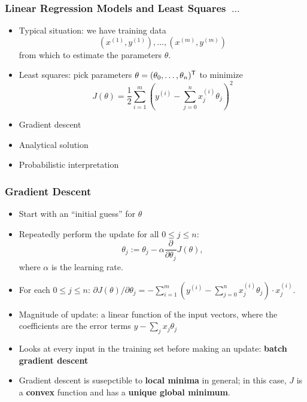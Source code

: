 \documentclass[xcolor=table]{beamer}
\newcommand{\trans}[1]{\ensuremath{#1}^{\footnotesize{\textsf{T}}}}
\begin{document}
\begin{frame}[t]
\frametitle{Linear Regression Models and Least Squares~$\ldots$}
\begin{itemize}
    \item Typical situation: we have training data 
    \[(x^{(1)}, y^{(1)}), \ldots, (x^{(m)}, y^{(m)})\] 
    from which to estimate the parameters $\theta$.
    
    \item Least squares: pick parameters $\theta = \trans{(\theta_0, \ldots, \theta_n)}$ to minimize 
    \[J(\theta) = 
    \frac{1}{2} \sum_{i = 1}^{m} \left (y^{(i)} - \sum_{j = 0}^{n} x^{(i)}_j \theta_j \right )^2\]   
\end{itemize}

\pause

\begin{itemize}
    \item Gradient descent
    \item Analytical solution
    \item Probabilistic interpretation
\end{itemize}
\end{frame}

\begin{frame}[t]
\frametitle{Gradient Descent}
\begin{itemize}
    \item Start with an ``initial guess'' for $\theta$

    \pause

    \item Repeatedly perform the update for all $0 \leq j \leq n$:
    \[
        \theta_j := \theta_j - \alpha \frac{\partial}{\partial \theta_j} J(\theta),
    \]
    where $\alpha$ is the learning rate.

    \pause 

    \item For each $0 \leq j \leq n$:
    $
        \partial J(\theta)/ \partial \theta_j = - \sum_{i = 1}^m 
        \left ( y^{(i)} - \sum_{j = 0}^n x_j^{(i)} \theta_j \right ) \cdot x_j^{(i)}.
    $
    
    \pause

    \item Magnitude of update: a linear function of the input vectors, where the
    coefficients are the error terms $y - \sum_j x_j \theta_j$

    \pause

    \item Looks at every input in the training set before making an update: \pause
    \textbf{batch gradient descent}
    
    \pause

    \item Gradient descent is susepctible to \textbf{local minima} in general; in
    this case, $J$ is a \textbf{convex} function and has a \textbf{unique global
    minimum}.  
\end{itemize}
\end{frame}
\end{document}
